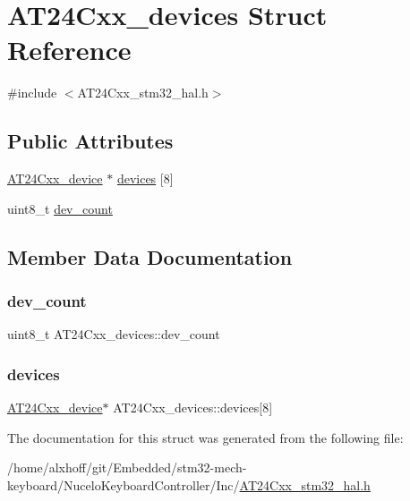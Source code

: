 \hypertarget{structAT24Cxx__devices}{}\section{A\+T24\+Cxx\+\_\+devices Struct Reference}
\label{structAT24Cxx__devices}


{\ttfamily \#include $<$A\+T24\+Cxx\+\_\+stm32\+\_\+hal.\+h$>$}

\subsection*{Public Attributes}
\begin{DoxyCompactItemize}
\item 
\hyperlink{structAT24Cxx__device}{A\+T24\+Cxx\+\_\+device} $\ast$ \hyperlink{structAT24Cxx__devices_a4fdc676b56a31dda127ffe29f1f9fb45}{devices} \mbox{[}8\mbox{]}
\item 
uint8\+\_\+t \hyperlink{structAT24Cxx__devices_add46d5b9fbeb6776a117d9a6f909b69b}{dev\+\_\+count}
\end{DoxyCompactItemize}


\subsection{Member Data Documentation}
\mbox{\label{structAT24Cxx__devices_add46d5b9fbeb6776a117d9a6f909b69b}} 
\subsubsection{\texorpdfstring{dev\+\_\+count}{dev\_count}}
{\footnotesize\ttfamily uint8\+\_\+t A\+T24\+Cxx\+\_\+devices\+::dev\+\_\+count}

\mbox{\label{structAT24Cxx__devices_a4fdc676b56a31dda127ffe29f1f9fb45}} 
\subsubsection{\texorpdfstring{devices}{devices}}
{\footnotesize\ttfamily \hyperlink{structAT24Cxx__device}{A\+T24\+Cxx\+\_\+device}$\ast$ A\+T24\+Cxx\+\_\+devices\+::devices\mbox{[}8\mbox{]}}



The documentation for this struct was generated from the following file\+:\begin{DoxyCompactItemize}
\item 
/home/alxhoff/git/\+Embedded/stm32-\/mech-\/keyboard/\+Nucelo\+Keyboard\+Controller/\+Inc/\hyperlink{AT24Cxx__stm32__hal_8h}{A\+T24\+Cxx\+\_\+stm32\+\_\+hal.\+h}\end{DoxyCompactItemize}
